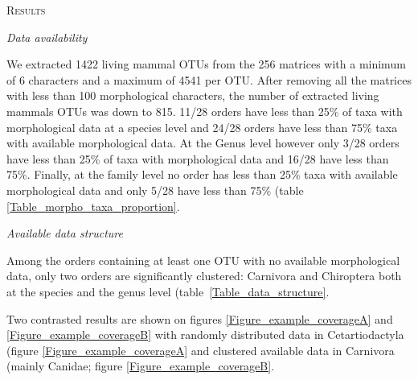 \documentclass[12pt,letterpaper]{article}
\renewcommand{\section}[1]{%
\bigskip
\begin{center}
\begin{Large}
\normalfont\scshape #1
\medskip
\end{Large}
\end{center}}
\renewcommand{\subsection}[1]{%
\bigskip
\begin{center}
\begin{large}
\normalfont\itshape #1
\end{large}
\end{center}}
\begin{document}
\section{Results}

\subsection{Data availability}
We extracted 1422 living mammal OTUs from the 256 matrices with a minimum of 6 characters and a maximum of 4541 per OTU. After removing all the matrices with less than 100 morphological characters, the number of extracted living mammals OTUs was down to 815. 11/28 orders have less than 25\% of taxa with morphological data at a species level and 24/28 orders have less than 75\% taxa with available morphological data. At the Genus level however only 3/28 orders have less than 25\% of taxa with morphological data and 16/28 have less than 75\%. Finally, at the family level no order has less than 25\% taxa with available morphological data and only 5/28 have less than 75\% (table \ref{Table_morpho_taxa_proportion}.

\renewcommand\baselinestretch{1.2}\selectfont
\begin{center}

\end{center}
\renewcommand\baselinestretch{2}\selectfont

\subsection{Available data structure}
Among the orders containing at least one OTU with no available morphological data, only two orders are significantly clustered: Carnivora and Chiroptera both at the species and the genus level (table~\ref{Table_data_structure}.

\renewcommand\baselinestretch{1.2}\selectfont
\begin{center}

\end{center}
\renewcommand\baselinestretch{2}\selectfont

Two contrasted results are shown on figures \ref{Figure_example_coverageA} and \ref{Figure_example_coverageB} with randomly distributed data in Cetartiodactyla (figure \ref{Figure_example_coverageA} and clustered available data in Carnivora (mainly Canidae; figure \ref{Figure_example_coverageB}.
\end{document}
